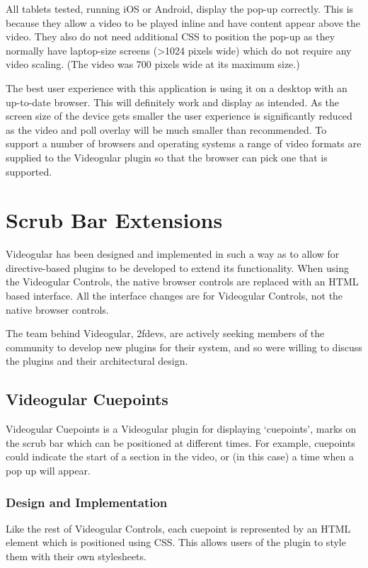 All tablets tested, running iOS or Android, display the pop-up correctly. This is because they allow a video to be played inline and have content appear above the video. They also do not need additional \gls{CSS} to position the pop-up as they normally have laptop-size screens (\textgreater 1024 pixels wide) which do not require any video scaling. (The video was 700 pixels wide at its maximum size.)

The best user experience with this application is using it on a desktop with an up-to-date browser. This will definitely work and display as intended. As the screen size of the device gets smaller the user experience is significantly reduced as the video and poll overlay will be much smaller than recommended. To support a number of browsers and operating systems a range of video formats are supplied to the \gls{Videogular} plugin so that the browser can pick one that is supported.

\section{Scrub Bar Extensions}
\label{Section:Scrub Bar Extensions}

\gls{Videogular} has been designed and implemented in such a way as to allow for directive-based plugins to be developed to extend its functionality. When using the \gls{Videogular} Controls, the native browser controls are replaced with an HTML based interface. All the interface changes are for \gls{Videogular} Controls, not the native browser controls.

The team behind \gls{Videogular}, 2fdevs, are actively seeking members of the community to develop new plugins for their system, and so were willing to discuss the plugins and their architectural design.

\subsection{Videogular Cuepoints}
\label{Subsection:vgCuepoints}
\gls{Videogular} Cuepoints is a \gls{Videogular} plugin for displaying `cuepoints', marks on the scrub bar which can be positioned at different times. For example, cuepoints could indicate the start of a section in the video, or (in this case) a time when a pop up will appear.

\subsubsection{Design and Implementation}
Like the rest of Videogular Controls, each cuepoint is represented by an HTML element which is positioned using \gls{CSS}. This allows users of the plugin to style them with their own stylesheets.

